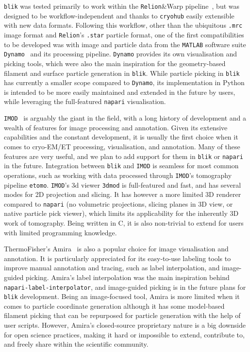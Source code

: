 \vspace{\baselineskip}

\texttt{blik} was tested primarily to work within the \texttt{Relion}\&Warp pipeline~\cite{scheresRELIONImplementationBayesian2012,tegunovMultiparticleCryoEMRefinement2021,burtFlexibleFrameworkMultiparticle2021}, but was designed to be workflow-independent and thanks to \texttt{cryohub} easily extensible with new data formats. Following this workflow, other than the ubiquitous \texttt{.mrc} image format and \texttt{Relion}'s \texttt{.star} particle format, one of the first compatibilities to be developed was with image and particle data from the \texttt{MATLAB} software suite \texttt{Dynamo}~\cite{castano-diezDynamoFlexibleUserfriendly2012} and its processing pipeline. \texttt{Dynamo} provides its own visualisation and picking tools, which were also the main inspiration for the geometry-based filament and surface particle generation in \texttt{blik}. While particle picking in \texttt{blik} has currently a smaller scope compared to \texttt{Dynamo}, its implementation in Python is intended to be more easily maintained and extended in the future by users, while leveraging the full-featured \texttt{napari} visualisation.

\texttt{IMOD}~\cite{kremerComputerVisualizationThreeDimensional1996} is arguably the giant in the field, with a long history of development and a wealth of features for image processing and annotation. Given its extensive capabilities and the constant development, it is usually the first choice when it comes to cryo-EM/ET processing, visualisation, and annotation. Many of these features are very useful, and we plan to add support for them in \texttt{blik} or \texttt{napari} in the future. Integration between \texttt{blik} and \texttt{IMOD} is seamless for most common operations, such as working with data processed through \texttt{IMOD}'s tomography pipeline \texttt{etomo}. \texttt{IMOD}'s 3d viewer \texttt{3dmod} is full-featured and fast, and has several modes for 2D projection and slicing. It has however a more limited 3D renderer compared to \texttt{napari} (no volumetric projections, slicing planes in 3D view, or native particle pick viewer), which limits its applicability for the inherently 3D work of tomography. Being written in C, it is also non-trivial to extend for users with limited programming knowledge.

ThermoFisher's Amira~\cite{thermofisherAmiraSoftwareLife} is also a popular choice for image visualisation and annotation. It is particularly appreciated for its easy-to-use labeling tools to improve manual annotation and tracing, such as label interpolation, and image-guided picking. Amira's label interpolation was the main inspiration behind \texttt{napari-label-interpolator}, and image-guided picking is in the future plans for \texttt{blik} development. Being an image-focused tool, Amira is more limited when it comes to particle coordinate generation although it has some model-based filament picking that can be repurposed for particle generation with the help of user scripts. However, Amira's closed-source proprietary nature is a big downside for open science practices, making it hard or impossible to extend, contribute to, and freely share within the scientific community.

